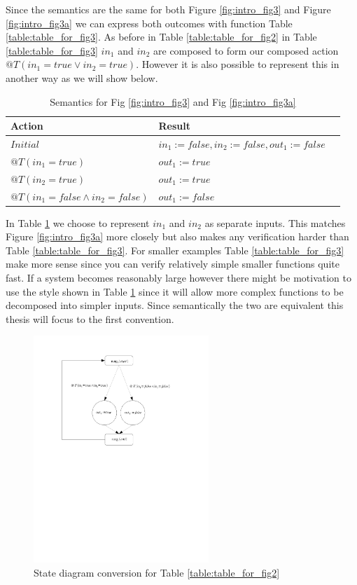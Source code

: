 Since the semantics are the same for both Figure \ref{fig:intro_fig3} and Figure \ref{fig:intro_fig3a} we can
express both outcomes with function Table \ref{table:table_for_fig3}.
As before in Table \ref{table:table_for_fig2} in Table \ref{table:table_for_fig3} $in_1$ and $in_2$ are composed to form our composed action $@T(in_1 = true \vee in_2 = true)$. However it is also possible to represent this in another way as we will show below.

\begin{table}[h]
    \centering
       \begin{tabular}{|l|l|l|}
        \hline
        Action & Result \\
        \hline
        $Initial$ &$in_1 := false, in_2 := false, out_1 := false$\\
        \hline
        $@T(in_1 = true)$ & $out_1 := true$ \\
        \hline
        $@T(in_2 = true)$ & $out_1 := true$ \\
        \hline
        $@T(in_1 = false \wedge in_2 = false)$ & $out_1 := false$\\
        \hline
    \end{tabular}
    \caption{Semantics for Fig \ref{fig:intro_fig3} and Fig \ref{fig:intro_fig3a}}
    \label{table:table_for_fig3a}
\end{table}

In Table \ref{table:table_for_fig3a} we choose to represent $in_1$ and $in_2$ as separate inputs. This matches Figure
\ref{fig:intro_fig3a} more closely but also makes any verification harder than Table \ref{table:table_for_fig3}. For
smaller examples Table \ref{table:table_for_fig3} make more sense since you can verify relatively simple smaller functions
quite fast. If a system becomes reasonably large however there might be motivation to use the style shown in 
Table \ref{table:table_for_fig3a} since it will allow more complex functions to be decomposed into simpler inputs.
Since semantically the two are equivalent this thesis will focus to the first convention.


\begin{figure}[h]
    \centering
    \includegraphics[trim= 0 140mm 40mm 10mm, clip, width=250px]{./images/intro_and_graph.pdf} %
    \caption{State diagram conversion for Table \ref{table:table_for_fig2}}
    \label{fig:intro_and_graph}
\end{figure}

